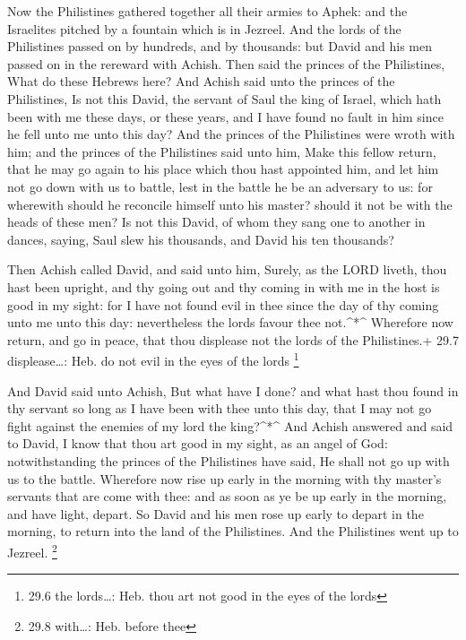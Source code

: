 Now the Philistines gathered together all their armies to
Aphek: and the Israelites pitched by a fountain which is in Jezreel.
 And the lords of the Philistines passed on by hundreds, and
by thousands: but David and his men passed on in the rereward with
Achish.  Then said the princes of the Philistines, What do
these Hebrews here? And Achish said unto the princes of the Philistines,
Is not this David, the servant of Saul the king of Israel, which hath
been with me these days, or these years, and I have found no fault in
him since he fell unto me unto this day?  And the princes of
the Philistines were wroth with him; and the princes of the Philistines
said unto him, Make this fellow return, that he may go again to his
place which thou hast appointed him, and let him not go down with us to
battle, lest in the battle he be an adversary to us: for wherewith
should he reconcile himself unto his master? should it not be with the
heads of these men?  Is not this David, of whom they sang
one to another in dances, saying, Saul slew his thousands, and David his
ten thousands?

 Then Achish called David, and said unto him, Surely, as the
LORD liveth, thou hast been upright, and thy going out and thy coming in
with me in the host is good in my sight: for I have not found evil in
thee since the day of thy coming unto me unto this day: nevertheless the
lords favour thee not.\^{}*\^{}  Wherefore now return, and
go in peace, that thou displease not the lords of the Philistines.+ 29.7
displease\ldots: Heb. do not evil in the eyes of the lords \footnote{29.6
  the lords\ldots: Heb. thou art not good in the eyes of the lords}

 And David said unto Achish, But what have I done? and what
hast thou found in thy servant so long as I have been with thee unto
this day, that I may not go fight against the enemies of my lord the
king?\^{}*\^{}  And Achish answered and said to David, I
know that thou art good in my sight, as an angel of God: notwithstanding
the princes of the Philistines have said, He shall not go up with us to
the battle.  Wherefore now rise up early in the morning
with thy master's servants that are come with thee: and as soon as ye be
up early in the morning, and have light, depart.  So David
and his men rose up early to depart in the morning, to return into the
land of the Philistines. And the Philistines went up to Jezreel.
\footnote{29.8 with\ldots: Heb. before thee}

